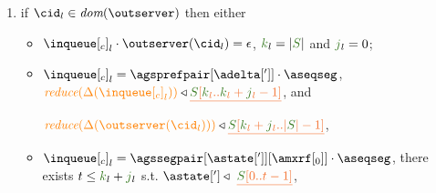\begin{definition}
\begin{enumerate}
%
%	


	
\item \label{prop_inclient} if $\cid_l \in \dom{\outserver}$ then either
    \begin{itemize}
     \item ${\inclient}_l \cdot \outserver(\cid_l)  = \epsilon$, $\tknown_l = |\queuemessage|$ and $\treceivebuffer_l =0$;

     \item ${\inclient}_l = \agsprefpair[{\adelta[']}]\cdot\aseqseg$,
      $\ireduce{\igetdeltas{{\inclient}_l}}\triangleleft \flatten{ \queuemessage[\tknown_l..\tknown_l+\treceivebuffer_l-1]}$,  and
      
      
      $\ireduce{\igetdeltas{\outserver(\cid_l)}}\triangleleft 
       \flatten{\queuemessage[\tknown_l+\treceivebuffer_l..|\queuemessage| - 1]}$,
  
%      
%	      
%	      
%
%     
%      
%           
     \item ${\inclient}_l = \agssegpair[{\astate[']}][{\amxrf[_0]}]\cdot\aseqseg$,      
  		 there exists $t \leq \tknown_l+\treceivebuffer_l$ s.t. $\astate['] \triangleleft \ \flatten{\queuemessage[0 .. t - 1]}$, 



\end{itemize}
\end{enumerate}
\end{definition}
